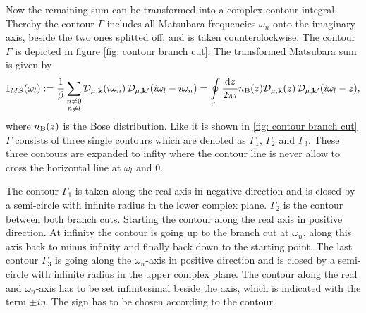 %
Now the remaining sum can be transformed into a complex contour integral.
Thereby the contour $\Gamma$ includes all Matsubara frequencies $\omega_{n}$ onto the imaginary axis, beside the two ones splitted off, and is taken counterclockwise.
The contour $\Gamma$ is depicted in figure \ref{fig: contour branch cut}.
The transformed Matsubara sum is given by
%
\begin{align}
	\mathrm{I}_{MS}(\omega_{l}) := 
		\frac{1}{\beta} \sum\limits_{\substack{n \neq 0 \\ n \neq l}} \mathcal{D}_{\mu,\vb{k}}(i\omega_{n}) \, \mathcal{D}_{\mu,\vb{k}'}(i\omega_{l}-i\omega_{n})
		=
		\oint\limits_{\Gamma} \frac{\dd{z}}{2\pi i} n_{\mathrm{B}}(z) \mathcal{D}_{\mu,\vb{k}}(z) \, \mathcal{D}_{\mu,\vb{k}'}(i\omega_{l}-z),
\end{align}
%
where $n_{\mathrm{B}}(z)$ is the Bose distribution.
Like it is shown in \ref{fig: contour branch cut} $\Gamma$ consists of three single contours which are denoted as $\Gamma_{1}$, $\Gamma_{2}$ and $\Gamma_{3}$.
These three contours are expanded to infity where the contour line is never allow to cross the horizontal line at $\omega_{l}$ and $0$.

The contour $\Gamma_{1}$ is taken along the real axis in negative direction and is closed by a semi-circle with infinite radius in the lower complex plane.
$\Gamma_{2}$ is the contour between both branch cuts.
Starting the contour along the real axis in positive direction.
At infinity the contour is going up to the branch cut at $\omega_{n}$, along this axis back to minus infinity and finally back down to the starting point.
The last contour $\Gamma_{3}$ is going along the $\omega_{n}$-axis in positive direction and is closed by a semi-circle with infinite radius in the upper complex plane.
The contour along the real and $\omega_{n}$-axis has to be set infinitesimal beside the axis, which is indicated with the term $\pm i\eta$.
The sign has to be chosen according to the contour.

